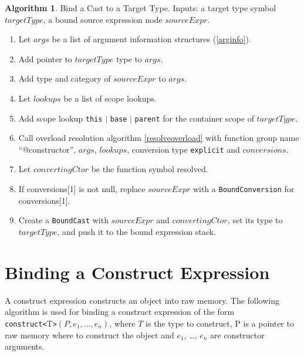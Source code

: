 \documentclass[a4paper,oneside,11pt]{book}
\theoremstyle{definition}
\newtheorem{algo}{Algorithm}[section]
\begin{document}
\begin{algo}\label{bindcasttype} Bind a Cast to a Target Type.
Inputs: a target type symbol $targetType$, a bound source expression node $sourceExpr$.
\begin{enumerate}
\item
Let $args$ be a list of argument information structures (\ref{arginfo}).
\item
Add pointer to $targetType$ type to $args$.
\item
Add type and category of $sourceExpr$ to $args$.
\item
Let $lookups$ be a list of scope lookups.
\item
Add scope lookup \verb|this| $|$ \verb|base| $|$ \verb|parent| for the container scope of $targetType$.
\item
Call overload resolution algorithm \ref{resolveoverload} with function group name ``@constructor'', $args$, $lookups$,
conversion type \verb|explicit| and $conversions$.
\item
Let $convertingCtor$ be the function symbol resolved.
\item
If conversions[1] is not null, replace $sourceExpr$ with a \verb|BoundConversion| for conversions[1].
\item
Create a \verb|BoundCast| with $sourceExpr$ and $convertingCtor$, set its type to $targetType$, and push it to the bound expression stack.
\end{enumerate}
\end{algo}

\section{Binding a Construct Expression}

A construct expression constructs an object into raw memory.
The following algorithm is used for binding a construct expression of the form\\\verb|construct<|T\verb|>|$(P, e_1, \ldots, e_n)$,
where $T$ is the type to construct, P is a pointer to raw memory where to construct the object and $e_1$, \ldots, $e_n$ are
constructor arguments.
\end{document}
